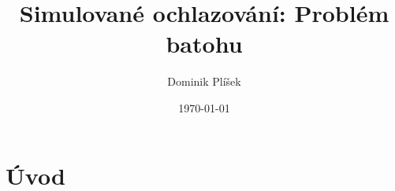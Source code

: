\documentclass[12pt,a4paper]{article}
\begin{document}
\title{Simulované ochlazování: Problém batohu}
\author{Dominik Plíšek}
\date{\dmyyyydate\today}
\maketitle

\tableofcontents


\section*{Úvod}
\end{document}
